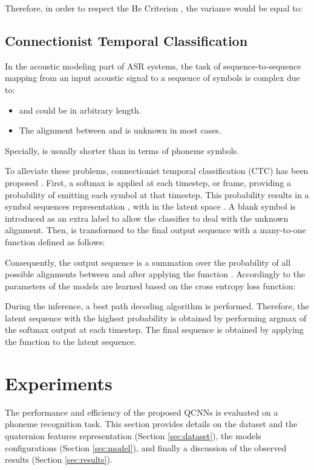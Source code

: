 \documentclass[a4paper]{article}
\begin{document}
Therefore, in order to respect the He Criterion \cite{he2015delving}, the variance would be equal to:




\subsection{Connectionist Temporal Classification}
\label{subsec:ctc}
In the acoustic modeling part of ASR systems, the task of sequence-to-sequence mapping from an input acoustic signal  to a sequence of symbols  is complex due to:
\begin{itemize}
\item  and  could be in arbitrary length.
\item The alignment between  and  is unknown in most cases.
\end{itemize}
Specially,  is usually shorter than  in terms of phoneme symbols.

To alleviate these problems, connectionist temporal classification (CTC) has been proposed \cite{graves2006connectionist}. First, a softmax is applied at each timestep, or frame, providing a probability of emitting each symbol  at that timestep. This probability results in a symbol sequences representation , with  in the latent space . A blank symbol  is introduced as an extra label to allow the classifier to deal with the unknown alignment. Then,  is transformed to the final output sequence with a many-to-one function  defined as follows:

Consequently, the output sequence is a summation over the probability of all possible alignments between  and  after applying the function . Accordingly to \cite{graves2006connectionist} the parameters of the models are learned based on the cross entropy loss function: 

During the inference, a best path decoding algorithm is performed. Therefore, the latent sequence with the highest probability is obtained by performing argmax of the softmax output at each timestep. The final sequence is obtained by applying the function  to the latent sequence. 





\section{Experiments}
\label{sec:exps}
The performance and efficiency of the proposed QCNNs is evaluated on a phoneme recognition task. This section provides details on the dataset and the quaternion features representation (Section \ref{sec:dataset}), the models configurations (Section \ref{sec:model}), and finally a discussion of the observed results (Section \ref{sec:results}).
\end{document}
